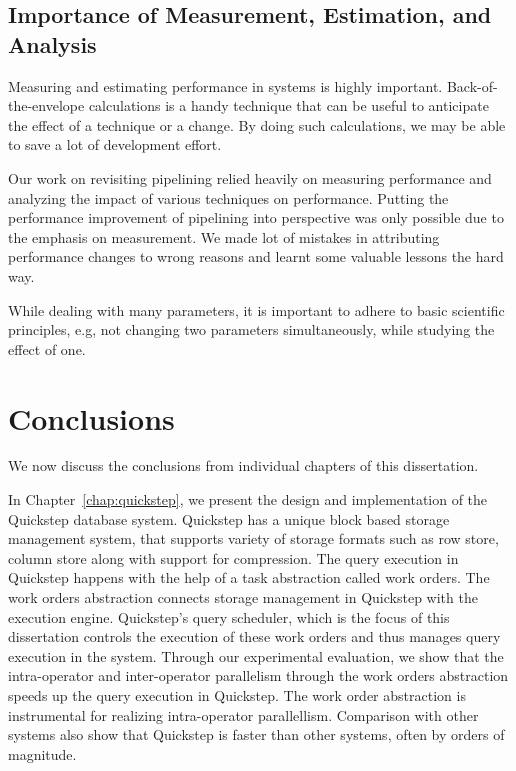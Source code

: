 \subsection{Importance of Measurement, Estimation, and Analysis}
Measuring and estimating performance in systems is highly important. 
Back-of-the-envelope calculations is a handy technique that can be useful to anticipate the effect of a technique or a change.
By doing such calculations, we may be able to save a lot of development effort. 

Our work on revisiting pipelining relied heavily on measuring performance and analyzing the impact of various techniques on performance. 
Putting the performance improvement of pipelining into perspective was only possible due to the emphasis on measurement.
We made lot of mistakes in attributing performance changes to wrong reasons and learnt some valuable lessons the hard way.

While dealing with many parameters, it is important to adhere to basic scientific principles, e.g, not changing two parameters simultaneously, while studying the effect of one.

\section{Conclusions}
We now discuss the conclusions from individual chapters of this dissertation. 

In Chapter~\ref{chap:quickstep}, we present the design and implementation of the Quickstep database system. 
Quickstep has a unique block based storage management system, that supports variety of storage formats such as row store, column store along with support for compression. 
The query execution in Quickstep happens with the help of a task abstraction called work orders. 
The work orders abstraction connects storage management in Quickstep with the execution engine. 
Quickstep's query scheduler, which is the focus of this dissertation controls the execution of these work orders and thus manages query execution in the system. 
Through our experimental evaluation, we show that the intra-operator and inter-operator parallelism through the work orders abstraction speeds up the query execution in Quickstep.
The work order abstraction is instrumental for realizing intra-operator parallellism.
Comparison with other systems also show that Quickstep is faster than other systems, often by orders of magnitude. 


